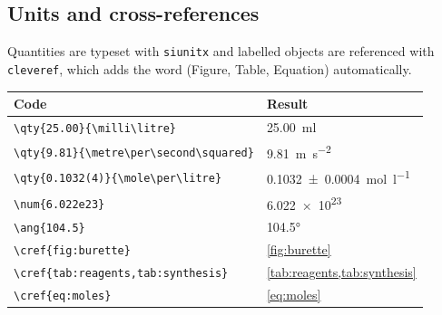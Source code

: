 \subsection*{Units and cross-references}
Quantities are typeset with \texttt{siunitx} and labelled objects are referenced with \texttt{cleveref}, which adds the word (Figure, Table, Equation) automatically.
\begin{center}
    \begin{tabular}{l l}
        \toprule
        \textbf{Code}                                & \textbf{Result}                         \\
        \midrule
        \verb|\qty{25.00}{\milli\litre}|             & \qty{25.00}{\milli\litre}               \\
        \verb|\qty{9.81}{\metre\per\second\squared}| & \qty{9.81}{\metre\per\second\squared}   \\
        \verb|\qty{0.1032(4)}{\mole\per\litre}|      & \qty{0.1032(4)}{\mole\per\litre}        \\
        \verb|\num{6.022e23}|                        & \num{6.022e23}                          \\
        \verb|\ang{104.5}|                           & \ang{104.5}                             \\
        \midrule
        \verb|\cref{fig:burette}|                    & \cref{fig:burette}                      \\
        \verb|\cref{tab:reagents,tab:synthesis}|     & \cref{tab:reagents,tab:synthesis}       \\
        \verb|\cref{eq:moles}|                       & \cref{eq:moles}                         \\
        \bottomrule
    \end{tabular}
\end{center}

